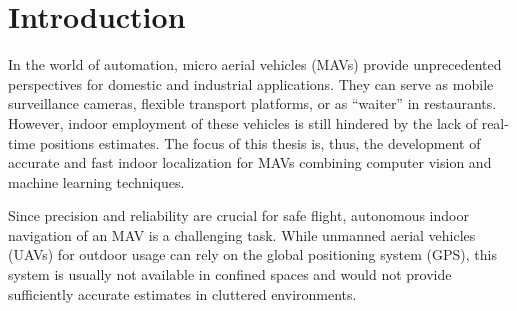 \chapter{Introduction}
\label{chap:introduction}


In the world of automation, micro aerial vehicles (MAVs) provide unprecedented perspectives for domestic and industrial applications. They can serve as mobile surveillance cameras, flexible transport platforms, or as ``waiter'' in restaurants. However, indoor employment of these vehicles
is still hindered by the lack of real-time positions estimates. The focus of this thesis is,
thus, the development of accurate and fast indoor localization for
MAVs combining computer vision and machine learning techniques.


Since precision and reliability are crucial for safe flight, autonomous indoor navigation of an MAV is a
challenging task. While unmanned aerial vehicles (UAVs) for
outdoor usage can rely on the global positioning system (GPS), this system is
usually not available in confined spaces and would not provide
sufficiently accurate estimates in cluttered environments.
